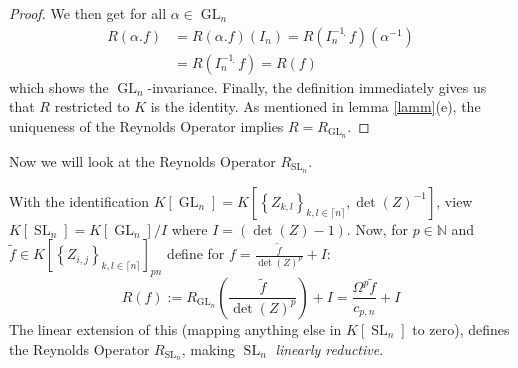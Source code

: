 \begin{proof}
  We then get for all $ \alpha \in \operatorname{GL}_n $
  \begin{equation}
    \begin{aligned}
      R \left( \alpha . f \right)
      &= R \left( \alpha . f \right) \left( I_n \right)
      = R \left( I_n^{-1} \dot{\phantom{.}} f \right) \left( \alpha^{-1} \right) \\
      & = R \left( I_n^{-1} \dot{\phantom{.}} f \right)
      = R (f)
    \end{aligned}
  \end{equation}
  which shows the $\operatorname{GL}_n$-invariance.
  Finally, the definition immediately gives us that $R$ restricted to $K$ is the identity.  As mentioned in lemma \ref{lamm}(e), the uniqueness of the Reynolds Operator implies $ R = R_{\operatorname{GL}_n} $.
\end{proof}

Now we will look at the Reynolds Operator $R_{\operatorname{SL}_n}$.

\begin{corollary}
  With the identification $ K \left\lbrack \operatorname{GL}_n \right\rbrack = K \left\lbrack \left\{ Z_{k,l} \right\}_{k,l \in \lceil n \rceil} , \operatorname{det} (Z) ^{-1} \right\rbrack $, view $ K \left\lbrack \operatorname{SL}_n \right\rbrack = K \left\lbrack \operatorname{GL}_n \right\rbrack / I $ where $ I = \left( \operatorname{det} (Z) -1 \right) $.
  Now, for $ p \in \mathbb{N} $ and $ \tilde{f} \in K \left\lbrack \left\{ Z_{i,j} \right\}_{k,l \in \lceil n \rceil} \right\rbrack_{pn} $ define for $ f = \frac{\tilde{f}}{\operatorname{det}(Z)^p} + I $:
  \begin{equation}
    R \left( f \right)
    := R_{\operatorname{GL}_n} \left( \frac{\tilde{f}}{\operatorname{det}(Z)^p} \right) + I
    = \frac{\Omega^p \tilde{f}}{c_{p,n}} + I
  \end{equation}
  The linear extension of this (mapping anything else in $K \left\lbrack \operatorname{SL}_n \right\rbrack$ to zero), defines the Reynolds Operator $R_{\operatorname{SL}_n}$, making $\operatorname{SL}_n$ \textit{linearly reductive}.
\end{corollary}

